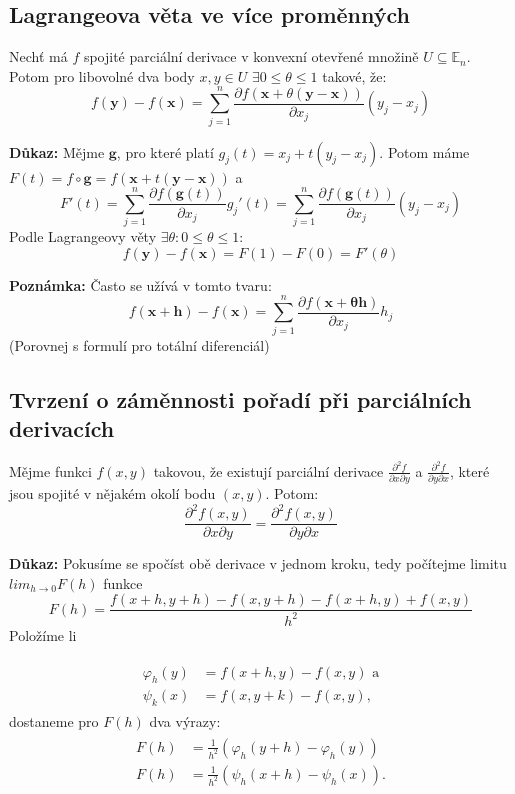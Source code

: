 \documentclass[../main.tex]{subfiles}
\begin{document}
\subsection{Lagrangeova věta ve více proměnných}
\hspace{1.2mm}
\noindent
Nechť má $f$ spojité parciální derivace v konvexní otevřené množině $U \subseteq \mathbb{E}_{n}$.
Potom pro libovolné dva body $x,y \in U$ $\exists 0 \leq \theta \leq 1$ takové, že:
\[ f(\mathbf{y}) - f(\mathbf{x}) =
\sum^{n}_{j=1} \frac{\partial f(\mathbf{x} + \theta (\mathbf{y}-\mathbf{x}))}{\partial x_j}(y_j - x_j) \]

\noindent
\textbf{Důkaz:}
Mějme $\mathbf{g}$, pro které platí $g_j(t) = x_j + t(y_j - x_j)$.
Potom máme $F(t) = f \circ \mathbf{g} = f(\mathbf{x} + t(\mathbf{y}-\mathbf{x}))$ a
\[ F'(t) = \sum^{n}_{j=1} \frac{\partial f(\mathbf{g}(t))}{\partial x_j}g_j'(t) =
\sum^{n}_{j=1} \frac{\partial f(\mathbf{g}(t))}{\partial x_j}(y_j - x_j)  \]
Podle Lagrangeovy věty $\exists \theta : 0 \leq \theta \leq 1$:
\[ f(\mathbf{y}) - f(\mathbf{x}) = F(1) - F(0) = F'(\theta) \]

\noindent
\textbf{Poznámka:}
Často se užívá v tomto tvaru:
\[ f(\mathbf{x} + \mathbf{h}) - f(\mathbf{x}) =
\sum^{n}_{j=1} \frac{\partial f(\mathbf{x + \theta \mathbf{h}})}{\partial x_j}h_j \]
(Porovnej s formulí pro totální diferenciál)

\subsection{Tvrzení o záměnnosti pořadí při parciálních derivacích}
\hspace{1.2mm}
\noindent
Mějme funkci $f(x,y)$ takovou, že existují parciální derivace
$\frac{\partial ^2 f}{\partial x \partial y}$ a $\frac{\partial ^2 f}{\partial y \partial x}$, které
jsou spojité v nějakém okolí bodu $(x,y)$. Potom:
\[ \frac{\partial ^2 f(x,y)}{\partial x \partial y} = \frac{\partial ^2 f(x,y)}{\partial y \partial x} \]

\noindent
\textbf{Důkaz:} Pokusíme se spočíst obě derivace v jednom kroku, tedy počítejme limitu $lim_{h\rightarrow 0} F(h)$ funkce
\[F(h) = \frac{f(x+h,y+h) - f(x,y+h) - f(x+h,y) + f(x,y)}{h^2}\]
Položíme li 

\begin{align*} 
\begin{split}
\varphi_h(y) & = f(x+h,y) - f(x,y)\text{ a}\\
\psi_k(x) & = f(x,y+k) - f(x,y),
\end{split}
\end{align*}
dostaneme pro $F(h)$ dva výrazy:
\begin{align*} 
\begin{split}
F(h) & = \frac{1}{h^2} (\varphi_h(y+h) - \varphi_h(y))\\
F(h) & = \frac{1}{h^2} (\psi_h(x+h)-\psi_h(x)).
\end{split}
\end{align*}
\end{document}
